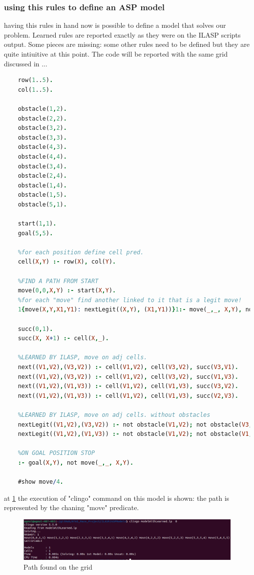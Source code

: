 \newpage

\subsubsection{using this rules to define an ASP model}
having this rules in hand now is possible to define a model that solves our problem. Learned rules are reported exactly as they were on the ILASP scripts output. Some pieces are missing: some other rules need to be defined but they are quite intiuitive at this point. The code will be reported with the same grid discussed in ...
 
\begin{lstlisting}[language=Prolog]
	%MODEL THAT SOLVES PROBLEM OF PATHFINDING IN THE GRID
	row(1..5).
	col(1..5).
	
	obstacle(1,2).
	obstacle(2,2).
	obstacle(3,2).
	obstacle(3,3).
	obstacle(4,3).
	obstacle(4,4).
	obstacle(3,4).
	obstacle(2,4).
	obstacle(1,4).
	obstacle(1,5).
	obstacle(5,1).
	
	start(1,1).
	goal(5,5).
	
	%for each position define cell pred.
	cell(X,Y) :- row(X), col(Y).
	
	%FIND A PATH FROM START
	move(0,0,X,Y) :- start(X,Y).
	%for each "move" find another linked to it that is a legit move!
	1{move(X,Y,X1,Y1): nextLegit((X,Y), (X1,Y1))}1:- move(_,_, X,Y), not goal(X,Y).
	
	succ(0,1).
	succ(X, X+1) :- cell(X,_).
	
	%LEARNED BY ILASP, move on adj cells.
	next((V1,V2),(V3,V2)) :- cell(V1,V2), cell(V3,V2), succ(V3,V1).
	next((V1,V2),(V3,V2)) :- cell(V1,V2), cell(V3,V2), succ(V1,V3).
	next((V1,V2),(V1,V3)) :- cell(V1,V2), cell(V1,V3), succ(V3,V2).
	next((V1,V2),(V1,V3)) :- cell(V1,V2), cell(V1,V3), succ(V2,V3).
	
	%LEARNED BY ILASP, move on adj cells. without obstacles
	nextLegit((V1,V2),(V3,V2)) :- not obstacle(V1,V2); not obstacle(V3,V2); next((V3,V2),(V1,V2)).
	nextLegit((V1,V2),(V1,V3)) :- not obstacle(V1,V2); not obstacle(V1,V3); next((V1,V2),(V1,V3)).
	
	%ON GOAL POSITION STOP
	:- goal(X,Y), not move(_,_, X,Y).
	
	#show move/4.
\end{lstlisting}

at \ref{fig:asd3} the execution of "clingo" command on this model is shown: the path is represented by the chaning "move" predicate.

\newpage
\begin{figure}
	\includegraphics[scale=0.45]{img/outputModel.png}
	\caption{Path found on the grid}\label{fig:asd3}
\end{figure}

